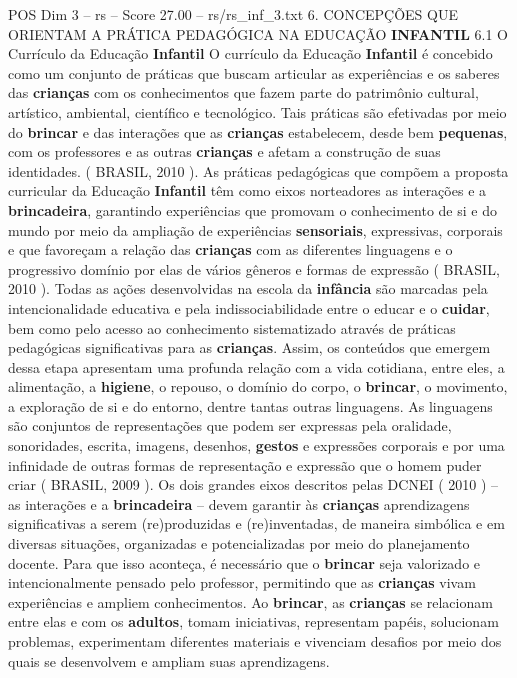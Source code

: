 \begin{textsample}{POS Dim 3 – rs – Score 27.00 – rs/rs\_inf\_3.txt}  \label{ex:f3_pos_242}
6.
CONCEPÇÕES QUE ORIENTAM A PRÁTICA PEDAGÓGICA NA EDUCAÇÃO \textbf{INFANTIL} 6.1 O Currículo da Educação \textbf{Infantil} O currículo da Educação \textbf{Infantil} é concebido como um conjunto de práticas que buscam articular as experiências e os saberes das \textbf{crianças} com os conhecimentos que fazem parte do patrimônio cultural, artístico, ambiental, científico e tecnológico.
Tais práticas são efetivadas por meio do \textbf{brincar} e das interações que as \textbf{crianças} estabelecem, desde bem \textbf{pequenas}, com os professores e as outras \textbf{crianças} e afetam a construção de suas identidades. ( BRASIL, 2010 ).
As práticas pedagógicas que compõem a proposta curricular da Educação \textbf{Infantil} têm como eixos norteadores as interações e a \textbf{brincadeira}, garantindo experiências que promovam o conhecimento de si e do mundo por meio da ampliação de experiências \textbf{sensoriais}, expressivas, corporais e que favoreçam a relação das \textbf{crianças} com as diferentes linguagens e o progressivo domínio por elas de vários gêneros e formas de expressão ( BRASIL, 2010 ).
Todas as ações desenvolvidas na escola da \textbf{infância} são marcadas pela intencionalidade educativa e pela indissociabilidade entre o educar e o \textbf{cuidar}, bem como pelo acesso ao conhecimento sistematizado através de práticas pedagógicas significativas para as \textbf{crianças}.
Assim, os conteúdos que emergem dessa etapa apresentam uma profunda relação com a vida cotidiana, entre eles, a alimentação, a \textbf{higiene}, o repouso, o domínio do corpo, o \textbf{brincar}, o movimento, a exploração de si e do entorno, dentre tantas outras linguagens.
As linguagens são conjuntos de representações que podem ser expressas pela oralidade, sonoridades, escrita, imagens, desenhos, \textbf{gestos} e expressões corporais e por uma infinidade de outras formas de representação e expressão que o homem puder criar ( BRASIL, 2009 ).
Os dois grandes eixos descritos pelas DCNEI ( 2010 ) – as interações e a \textbf{brincadeira} – devem garantir às \textbf{crianças} aprendizagens significativas a serem (re)produzidas e (re)inventadas, de maneira simbólica e em diversas situações, organizadas e potencializadas por meio do planejamento docente.
Para que isso aconteça, é necessário que o \textbf{brincar} seja valorizado e intencionalmente pensado pelo professor, permitindo que as \textbf{crianças} vivam experiências e ampliem conhecimentos.
Ao \textbf{brincar}, as \textbf{crianças} se relacionam entre elas e com os \textbf{adultos}, tomam iniciativas, representam papéis, solucionam problemas, experimentam diferentes materiais e vivenciam desafios por meio dos quais se desenvolvem e ampliam suas aprendizagens.

\end{textsample}
